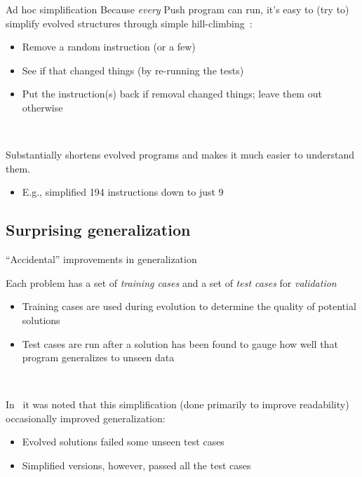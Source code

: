 \documentclass{beamer}
\begin{document}
\begin{frame}{Ad hoc simplification}
Because \emph{every} Push program can run, it's easy to (try to) simplify evolved structures through simple hill-climbing~\cite{Spector:2014:GECCOcomp}:
\begin{itemize}
	\item Remove a random instruction (or a few)
	\item See if that changed things (by re-running the tests)
	\item Put the instruction(s) back if removal changed things; leave them out otherwise
\end{itemize}
 
 ~
 
 Substantially shortens evolved programs and makes it much easier to
 understand them.
 \begin{itemize}
 	\item E.g., simplified 194 instructions down to just 9
 \end{itemize}
\end{frame}

\subsection{Surprising generalization}

\begin{frame}{``Accidental'' improvements in generalization}

Each problem has a set of \emph{training cases} and a set of \emph{test cases} for \emph{validation}~\cite{Helmuth:2015:GECCO}
\begin{itemize}
	\item Training cases are used during evolution to determine the quality of potential solutions
	\item Test cases are run after a solution has been found to gauge how well that program generalizes to unseen data
\end{itemize}

~

In~\cite{Helmuth:2015:dissertation} it was noted that this simplification (done primarily to improve readability) occasionally improved generalization:
\begin{itemize}
	\item Evolved solutions failed some unseen test cases
	\item Simplified versions, however, passed all the test cases
\end{itemize}


\end{frame}
\end{document}
